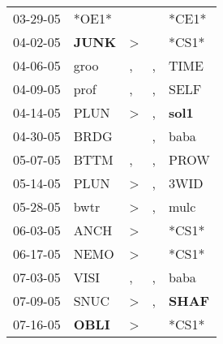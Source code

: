 \begin{supertabular}{p{0.07\textwidth}p{0.06\textwidth}p{0.02\textwidth}p{0.02\textwidth}p{0.06\textwidth}}
          03-29-05\textsuperscript{} &                            *OE1* &                  &                  &                            *CE1* \\
          04-02-05\textsuperscript{} &  \textbf{JUNK\textsuperscript{}} &     \textgreater &                  &                            *CS1* \\
          04-06-05\textsuperscript{} &           groo\textsuperscript{} &                , &                , &           TIME\textsuperscript{} \\
          04-09-05\textsuperscript{} &           prof\textsuperscript{} &                , &                , &           SELF\textsuperscript{} \\
          04-14-05\textsuperscript{} &           PLUN\textsuperscript{} &     \textgreater &                , &  \textbf{sol1\textsuperscript{}} \\
          04-30-05\textsuperscript{} &           BRDG\textsuperscript{} &                  &                , &           baba\textsuperscript{} \\
          05-07-05\textsuperscript{} &           BTTM\textsuperscript{} &                , &                , &           PROW\textsuperscript{} \\
          05-14-05\textsuperscript{} &           PLUN\textsuperscript{} &     \textgreater &                , &           3WID\textsuperscript{} \\
          05-28-05\textsuperscript{} &           bwtr\textsuperscript{} &     \textgreater &                , &           mulc\textsuperscript{} \\
          06-03-05\textsuperscript{} &           ANCH\textsuperscript{} &     \textgreater &                  &                            *CS1* \\
          06-17-05\textsuperscript{} &           NEMO\textsuperscript{} &     \textgreater &                  &                            *CS1* \\
          07-03-05\textsuperscript{} &           VISI\textsuperscript{} &                , &                , &           baba\textsuperscript{} \\
          07-09-05\textsuperscript{} &           SNUC\textsuperscript{} &     \textgreater &                , &  \textbf{SHAF\textsuperscript{}} \\
          07-16-05\textsuperscript{} &  \textbf{OBLI\textsuperscript{}} &     \textgreater &                  &                            *CS1* \\

\end{supertabular}
